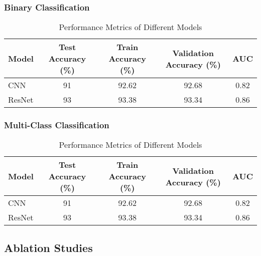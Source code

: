 \documentclass{article}
\begin{document}
\subsubsection{Binary Classification}

\renewcommand{\arraystretch}{1.2} 
\begin{table}[h!] %
    \centering %
    \caption{Performance Metrics of Different Models} %
    \label{tab:semi_binary_perf} %
    \begin{tabular}{|l|c|c|c|c|}
        \hline
        Model & Test Accuracy (\%) & Train Accuracy (\%) & Validation Accuracy (\%) & AUC \\
        \hline
        CNN & 91 & 92.62 & 92.68 & 0.82 \\
        ResNet & 93 & 93.38 & 93.34 & 0.86 \\
        \hline
    \end{tabular}
\end{table}

\subsubsection{Multi-Class Classification}

\renewcommand{\arraystretch}{1.2} 
\begin{table}[h!] %
    \centering %
    \caption{Performance Metrics of Different Models} %
    \label{tab:semi_multi_perf} %
    \begin{tabular}{|l|c|c|c|c|}
        \hline
        Model & Test Accuracy (\%) & Train Accuracy (\%) & Validation Accuracy (\%) & AUC \\
        \hline
        CNN & 91 & 92.62 & 92.68 & 0.82 \\
        ResNet & 93 & 93.38 & 93.34 & 0.86 \\
        \hline
    \end{tabular}
\end{table}

\subsection{Ablation Studies}
\end{document}
